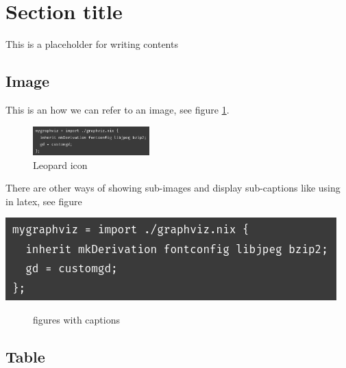 \documentclass[a4paper,11pt]{article}
\author{Ryu Shinyoung}
\date{}
\title{}
\begin{document}
\section*{Section title}
\label{sec:org7ee4007}

This is a placeholder for writing contents


\subsection*{Image}
\label{sec:orgc85d3aa}

This is an how we can refer to an image, see figure \ref{fig:leopard-icon}.

\begin{figure}[htbp]
\centering
\includegraphics[width=0.4\textwidth]{../../img/7/Input pattern.png}
\caption{\label{fig:leopard-icon}Leopard icon}
\end{figure}

There are other ways of showing sub-images and display sub-captions like using in latex,
see figure \begin{center}
\includegraphics[width=.9\linewidth]{../../img/7/Input pattern.png}
\end{center}

\begin{figure}
    \centering
\caption{\label{fig:subfig}figures with captions}
\end{figure}


\subsection*{Table}
\label{sec:orgf042376}
\end{document}
